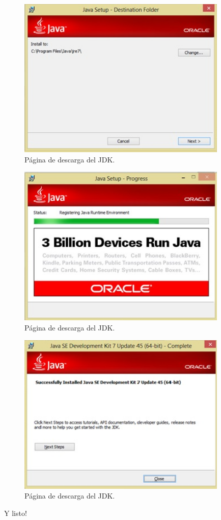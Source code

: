 \documentclass[12pt]{book} %
\begin{document}
\begin{enumerate}
\begin{figure}[h!]
	\end{figure}
	\begin{figure}[h!]
		\centering
			\includegraphics[width=10cm]{ins6.jpg}
			\caption{P\'agina de descarga del JDK.}
		
	\end{figure}
	\begin{figure}[h!]
		\centering
			\includegraphics[width=10cm]{ins7.jpg}
			\caption{P\'agina de descarga del JDK.}
		
	\end{figure}
	\begin{figure}[t!]
		\centering
			\includegraphics[width=10cm]{ins8.jpg}
			\caption{P\'agina de descarga del JDK.}
		
	\end{figure}
Y listo!
\end{enumerate}
\end{document}
